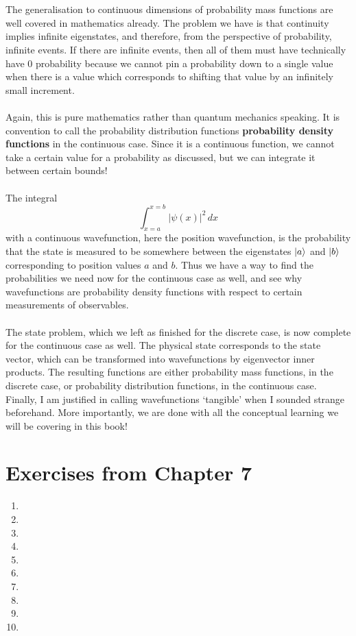 \\\\
The generalisation to continuous dimensions of probability mass functions are well covered in mathematics already. The problem we have is that continuity implies infinite eigenstates, and therefore, from the perspective of probability, infinite events. If there are infinite events, then all of them must have technically have $0$ probability because we cannot pin a probability down to a single value when there is a value which corresponds to shifting that value by an infinitely small increment.
\\\\
Again, this is pure mathematics rather than quantum mechanics speaking. It is convention to call the probability distribution functions \textbf{probability density functions} in the continuous case. Since it is a continuous function, we cannot take a certain value for a probability as discussed, but we can integrate it between certain bounds!
\\\\
The integral 
$$
\int_{x=a}^{x=b}|\psi(x)|^2\,dx
$$
with a continuous wavefunction, here the position wavefunction, is the probability that the state is measured to be somewhere between the eigenstates $|a\rangle$ and $|b\rangle$ corresponding to position values $a$ and $b$. Thus we have a way to find the probabilities we need now for the continuous case as well, and see why wavefunctions are probability density functions with respect to certain measurements of observables.
\\\\
The state problem, which we left as finished for the discrete case, is now complete for the continuous case as well. The physical state corresponds to the state vector, which can be transformed into wavefunctions by eigenvector inner products. The resulting functions are either probability mass functions, in the discrete case, or probability distribution functions, in the continuous case. Finally, I am justified in calling wavefunctions `tangible' when I sounded strange beforehand. More importantly, we are done with all the conceptual learning we will be covering in this book!
\section{Exercises from Chapter 7}
\begin{enumerate}
    \item 
    \item
    \item
    \item
    \item
    \item
    \item
    \item
    \item
    \item
\end{enumerate}
